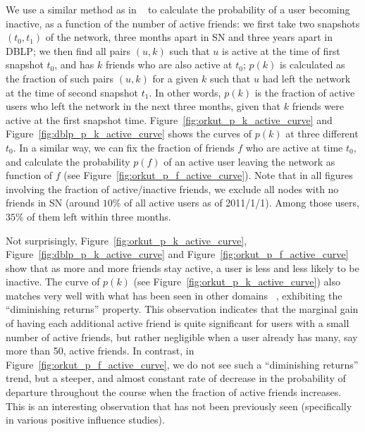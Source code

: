 \documentclass[phd,tocprelim]{cornell}
\begin{document}
We use a similar method as in ~\cite{Backstrom:2006} to calculate the probability of a user becoming inactive, as a function of the number of active friends: we first take two snapshots $(t_0, t_1)$ of the network, three months apart in SN and three years apart in DBLP; we then find all pairs $(u,k)$ such that $u$ is active at the time of first snapshot $t_0$, and has $k$ friends who are also active at $t_0$; $p(k)$ is calculated as the fraction of such pairs $(u,k)$ for a given $k$ such that $u$ had left the network at the time of second snapshot $t_1$. In other words, $p(k)$ is the fraction of active users who left the network in the next three months, given that $k$ friends were active at the first snapshot time. Figure~\ref{fig:orkut_p_k_active_curve} and Figure~\ref{fig:dblp_p_k_active_curve} shows the curves of $p(k)$ at three different $t_0$. In a similar way, we can fix the fraction of friends $f$ who are active at time $t_0$, and calculate the probability $p(f)$ of an active user leaving the network as function of $f$ (see Figure~\ref{fig:orkut_p_f_active_curve}). Note that in all figures involving the fraction of active/inactive friends, we exclude all nodes with no friends in SN (around $10\%$ of all active users as of 2011/1/1). Among those users, $35\%$ of them left within three months.

Not surprisingly, Figure~\ref{fig:orkut_p_k_active_curve}, Figure~\ref{fig:dblp_p_k_active_curve} and Figure~\ref{fig:orkut_p_f_active_curve} show that as more and more friends stay active, a user is less and less likely to be inactive. The curve of $p(k)$ (see Figure~\ref{fig:orkut_p_k_active_curve}) also matches very well with what has been seen in other domains ~\cite{Backstrom:2006}, exhibiting the ``diminishing returns'' property.
This observation indicates that the marginal gain of having each additional active friend is quite significant for users with a small number of active friends, but rather negligible when a user already has many, say more than 50,  active friends. In contrast, in Figure~\ref{fig:orkut_p_f_active_curve}, we do not see such a ``diminishing returns'' trend, but a steeper, and almost constant rate of decrease in the probability of departure throughout the course when the fraction of active friends increases. This is an interesting observation that has not been previously seen (specifically in various positive influence studies). 
\end{document}

